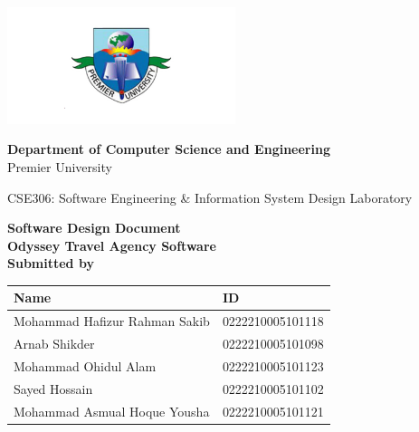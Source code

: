 \documentclass{scrreprt}
\renewcommand{\arraystretch}{1.5}
\begin{document}
\begin{titlepage}
    \centering
    \begin{center}
        \includegraphics[width=0.5\textwidth]{./logo.png} %
    \end{center}
\begin{center}
    \textbf{Department of Computer Science and Engineering}\\
    Premier University
\end{center}
\begin{center}
    \textnormal{ CSE306: Software Engineering \& Information System Design Laboratory }
\end{center}
    \huge
    \textbf{Software Design Document}\\
    \vspace{0.5in}
    \LARGE
    \textbf{Odyssey Travel Agency Software}\\
    \vspace{1in}
    \large
    \textbf {Submitted by}\\
    \begin{center}
        \renewcommand{\arraystretch}{1.5} %
        \begin{tabular}{|>{\raggedright\arraybackslash}p{}|p{}|} %
        \hline
        \textbf{Name} & \textbf{ID} \\
        \hline
        Mohammad Hafizur Rahman Sakib & 0222210005101118 \\
        \hline
        Arnab Shikder & 0222210005101098 \\
        \hline
        Mohammad Ohidul Alam & 0222210005101123 \\
        \hline
        Sayed Hossain & 0222210005101102 \\
        \hline
        Mohammad Asmual Hoque Yousha & 0222210005101121 \\
        \hline
        \end{tabular}
        \end{center}
    \vspace{0.5in}
 

\end{titlepage}
\end{document}
